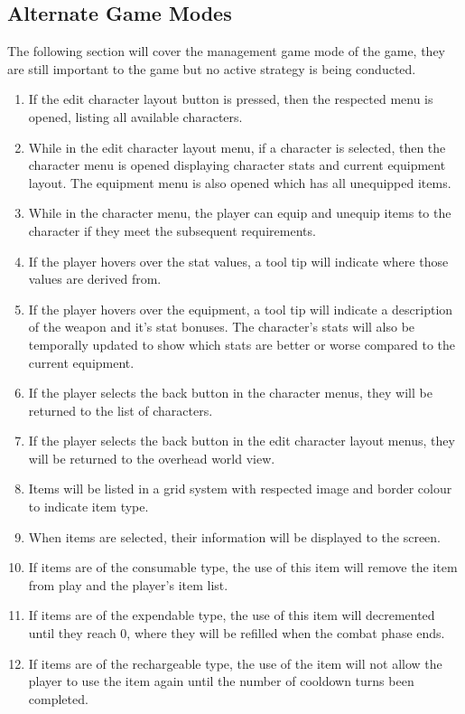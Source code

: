 \documentclass{article}
\begin{document}
\subsection{Alternate Game Modes}
\quad The following section will cover the management game mode of the game, they are still important to the game but no active strategy is being conducted.
\begin{enumerate}[{AGR}1. ]
	\item If the edit character layout button is pressed, then the respected menu is opened, listing all available characters.
	\item While in the edit character layout menu, if a character is selected, then the character menu is opened displaying character stats and current equipment layout. The equipment menu is also opened which has all unequipped items.
	\item While in the character menu, the player can equip and unequip items to the character if they meet the subsequent requirements.
	\item If the player hovers over the stat values, a tool tip will indicate where those values are derived from.
	\item If the player hovers over the equipment, a tool tip will indicate a description of the weapon and it's stat bonuses. The character's stats will also be temporally updated to show which stats are better or worse compared to the current equipment.
	\item If the player selects the back button in the character menus, they will be returned to the list of characters.
	\item  If the player selects the back button in the edit character layout menus, they will be returned to the overhead world view.
	\item Items will be listed in a grid system with respected image and border colour to indicate item type.
	\item When items are selected, their information will be displayed to the screen.
	\item If items are of the consumable type, the use of this item will remove the item from play and the player's item list.
	\item If items are of the expendable type, the use of this item will decremented until they reach 0, where they will be refilled when the combat phase ends.
	\item If items are of the rechargeable type, the use of the item will not allow the player to use the item again until the number of cooldown turns been completed.

\end{enumerate}
\end{document}
